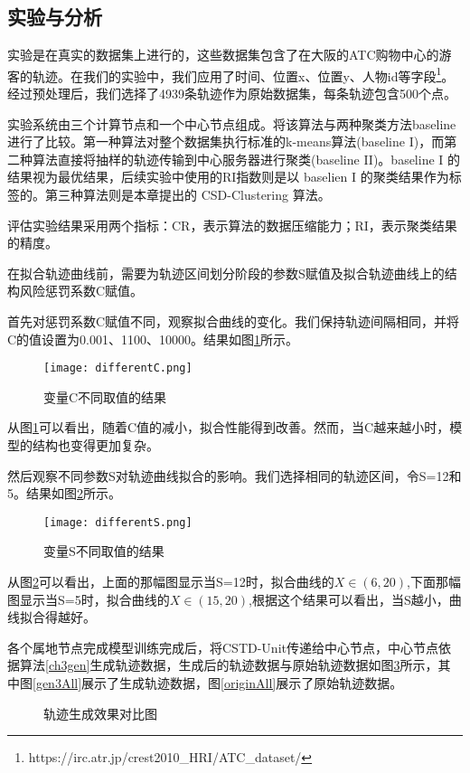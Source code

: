 \subsection{实验与分析}
实验是在真实的数据集上进行的，这些数据集包含了在大阪的ATC购物中心的游客的轨迹。在我们的实验中，我们应用了时间、位置x、位置y、人物id等字段\footnote[1]{https://irc.atr.jp/crest2010_HRI/ATC_dataset/}。经过预处理后，我们选择了4939条轨迹作为原始数据集，每条轨迹包含500个点。

实验系统由三个计算节点和一个中心节点组成。将该算法与两种聚类方法baseline进行了比较。第一种算法对整个数据集执行标准的k-means算法(baseline I)，而第二种算法直接将抽样的轨迹传输到中心服务器进行聚类(baseline II)。baseline I 的结果视为最优结果，后续实验中使用的RI指数则是以 baselien I 的聚类结果作为标签的。第三种算法则是本章提出的 CSD-Clustering 算法。

评估实验结果采用两个指标：CR，表示算法的数据压缩能力；RI，表示聚类结果的精度。

在拟合轨迹曲线前，需要为轨迹区间划分阶段的参数S赋值及拟合轨迹曲线上的结构风险惩罚系数C赋值。

首先对惩罚系数C赋值不同，观察拟合曲线的变化。我们保持轨迹间隔相同，并将C的值设置为0.001、1100、10000。结果如图\ref{differentC}所示。
\begin{figure}[H]
	\texttt{[image: differentC.png]}
	\caption{变量C不同取值的结果}
	\label{differentC}
\end{figure}

从图\ref{differentC}可以看出，随着C值的减小，拟合性能得到改善。然而，当C越来越小时，模型的结构也变得更加复杂。

然后观察不同参数S对轨迹曲线拟合的影响。我们选择相同的轨迹区间，令S=12和5。结果如图\ref{differentS}所示。
\begin{figure}[H]
	\texttt{[image: differentS.png]}
	\caption{变量S不同取值的结果}
	\label{differentS}
\end{figure}

从图\ref{differentS}可以看出，上面的那幅图显示当S=12时，拟合曲线的$X∈(6,20)$,下面那幅图显示当S=5时，拟合曲线的$X∈(15,20)$,根据这个结果可以看出，当S越小，曲线拟合得越好。

各个属地节点完成模型训练完成后，将CSTD-Unit传递给中心节点，中心节点依据算法\ref{ch3gen}生成轨迹数据，生成后的轨迹数据与原始轨迹数据如图\ref{ch3GenAndOrigin}所示，其中图\ref{gen3All}展示了生成轨迹数据，图\ref{originAll}展示了原始轨迹数据。
\begin{figure}[H]
\caption{轨迹生成效果对比图}
\label{ch3GenAndOrigin}
\end{figure}


